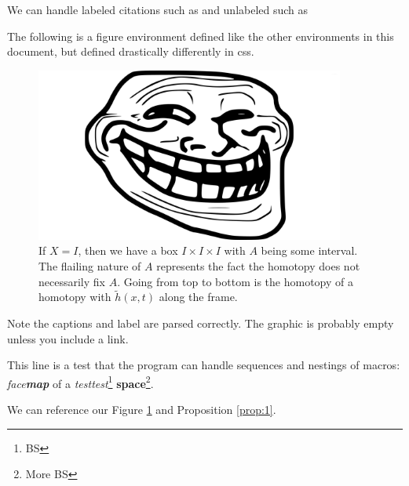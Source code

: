 \documentclass{amsart}
\theoremstyle{plain}
\begin{document}
We can handle labeled citations such as \cite[Proposition VII.8.8]{Bredon1993} and unlabeled such as \cite{Bredon1993}

The following is a figure environment defined like the other environments in this document, but defined drastically differently in css.
\begin{figure}
    \includegraphics[width=4in]{image.jpg}
    \caption{If $X=I$, then we have a box $I\times I\times I$ with $A$ being some interval. The flailing nature of $A$ represents the fact the homotopy does not necessarily fix $A$. Going from top to bottom is the homotopy of a homotopy with $\tilde h(x,t)$ along the frame.}\label{fig:2}
\end{figure}
Note the captions and label are parsed correctly. The graphic is probably empty unless you include a link.

This line is a test that the program can handle sequences and nestings of macros: \textit{face\textbf{map}} of a \textit{test\textit{test}}\footnote{BS} \textbf{space}\footnote{More BS}. \cite[Proposition VII.8.8]{Bredon1993} \cite[Proposition VII.8.8]{Bredon1993}

We can reference our Figure \ref{fig:2} and Proposition \ref{prop:1}.
\end{document}

